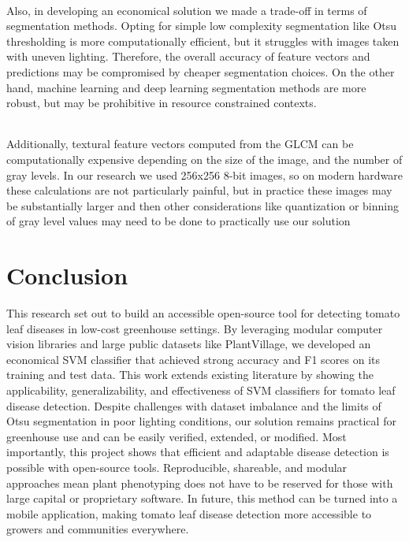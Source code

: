 \subparagraph{}
Also, in developing an economical solution we made a trade-off in terms of
segmentation methods. Opting for simple low complexity segmentation like
Otsu thresholding is more computationally efficient, but it struggles with images
taken with uneven lighting. Therefore, the overall accuracy of feature vectors
and predictions may be compromised by cheaper segmentation choices. On the
other hand, machine learning and deep learning segmentation methods are more
robust, but may be prohibitive in resource constrained contexts.

\subparagraph{}
Additionally, textural feature vectors computed from the GLCM can be computationally expensive depending on the size of the image, and the number of
gray levels. In our research we used 256x256 8-bit images, so on modern hardware these calculations are not particularly painful, but in practice these images
may be substantially larger and then other considerations like quantization or
binning of gray level values may need to be done to practically use our solution

\chapter{Conclusion}

This research set out to build an accessible open-source tool for detecting
tomato leaf diseases in low-cost greenhouse settings. By leveraging modular
computer vision libraries and large public datasets like PlantVillage, we developed an economical SVM classifier that achieved strong accuracy and F1 scores
on its training and test data. This work extends existing literature by showing
the applicability, generalizability, and effectiveness of SVM classifiers for tomato
leaf disease detection. Despite challenges with dataset imbalance and the limits
of Otsu segmentation in poor lighting conditions, our solution remains practical for greenhouse use and can be easily verified, extended, or modified. Most
importantly, this project shows that efficient and adaptable disease detection
is possible with open-source tools. Reproducible, shareable, and modular approaches mean plant phenotyping does not have to be reserved for those with
large capital or proprietary software. In future, this method can be turned into
a mobile application, making tomato leaf disease detection more accessible to
growers and communities everywhere.